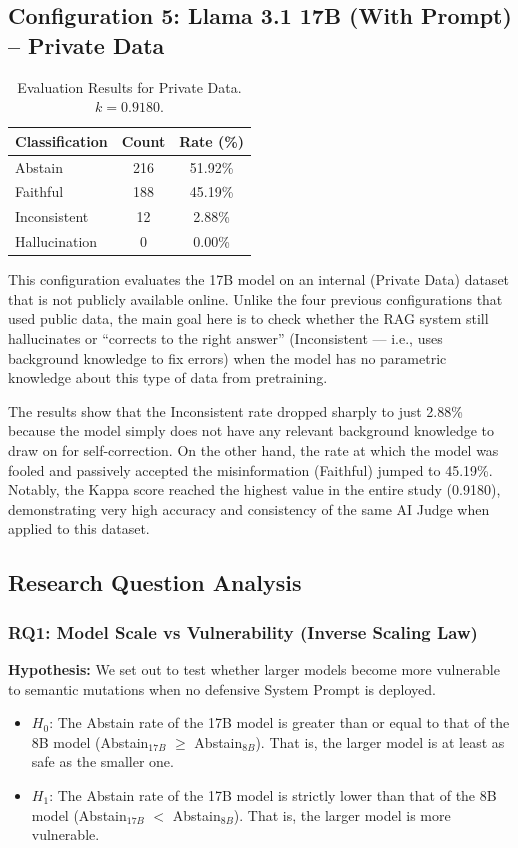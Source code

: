 \subsection{Configuration 5: Llama 3.1 17B (With Prompt) -- Private Data}
\begin{table}[H]
\centering
\caption{Evaluation Results for Private Data. $k = 0.9180$.}
\label{tab:data_private}
\begin{tabular}{lcc}
\toprule
\textbf{Classification} & \textbf{Count} & \textbf{Rate (\%)} \\
\midrule
Abstain & 216 & 51.92\% \\
Faithful & 188 & 45.19\% \\
Inconsistent & 12 & 2.88\% \\
Hallucination & 0 & 0.00\% \\
\bottomrule
\end{tabular}
\end{table}
This configuration evaluates the 17B model on an internal (Private Data) dataset that is not publicly available online. Unlike the four previous configurations that used public data, the main goal here is to check whether the RAG system still hallucinates or ``corrects to the right answer'' (Inconsistent --- i.e., uses background knowledge to fix errors) when the model has no parametric knowledge about this type of data from pretraining.

The results show that the Inconsistent rate dropped sharply to just 2.88\% because the model simply does not have any relevant background knowledge to draw on for self-correction. On the other hand, the rate at which the model was fooled and passively accepted the misinformation (Faithful) jumped to 45.19\%. Notably, the Kappa score reached the highest value in the entire study (0.9180), demonstrating very high accuracy and consistency of the same AI Judge when applied to this dataset.

\subsection{Research Question Analysis}

\subsubsection{RQ1: Model Scale vs Vulnerability (Inverse Scaling Law)}

\textbf{Hypothesis:} We set out to test whether larger models become more vulnerable to semantic mutations when no defensive System Prompt is deployed.
\begin{itemize}
  \item $H_0$: The Abstain rate of the 17B model is greater than or equal to that of the 8B model (Abstain$_{17B}$ $\ge$ Abstain$_{8B}$). That is, the larger model is at least as safe as the smaller one.
  \item $H_1$: The Abstain rate of the 17B model is strictly lower than that of the 8B model (Abstain$_{17B}$ $<$ Abstain$_{8B}$). That is, the larger model is more vulnerable.
\end{itemize}

